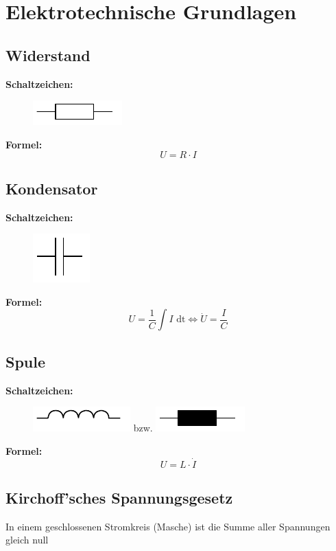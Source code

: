 \documentclass[10pt,a4paper]{article}
\begin{document}

\section{Elektrotechnische Grundlagen}
\subsection{Widerstand}
\textbf{Schaltzeichen:} \\
\begin{figure}[H]
	\includegraphics[width=0.15\columnwidth]{imgs/widerstand.pdf}
\end{figure}
\textbf{Formel:}
$$
	U = R ⋅ I
$$

\subsection{Kondensator}
\textbf{Schaltzeichen:} \\
\begin{figure}[H]
	\includegraphics[width=0.1\columnwidth]{imgs/kondensator.pdf}
\end{figure}
\textbf{Formel:}
$$
	U = \frac 1 C \int I \textrm{ dt} \iff \dot U = \frac I C
$$

\subsection{Spule}
\textbf{Schaltzeichen:} \\
\begin{figure}[H]
	\includegraphics[width=0.1\columnwidth]{imgs/spule.pdf} bzw. 
	\includegraphics[width=0.1\columnwidth]{imgs/spule_alt.pdf}	
\end{figure}
\textbf{Formel:}
$$
	U = L ⋅ \dot I
$$

\subsection{Kirchoff'sches Spannungsgesetz}
In einem geschlossenen Stromkreis (Masche) ist die Summe aller Spannungen gleich null \\
\end{document}

